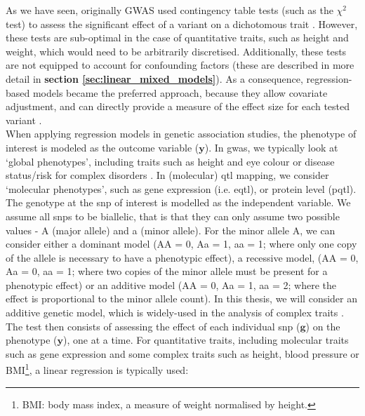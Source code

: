 As we have seen, originally GWAS used contingency table tests (such as the $\chi^2$ test) to assess the significant effect of a variant on a dichotomous trait \cite{mccarthy2008genome}.
However, these tests are sub-optimal in the case of quantitative traits, such as height and weight, which would need to be arbitrarily discretised.
Additionally, these tests are not equipped to account for confounding factors (these are described in more detail in \textbf{section \ref{sec:linear_mixed_models}}).
As a consequence, regression-based models became the preferred approach, because they allow covariate adjustment, and can directly provide a measure of the effect size for each tested variant \cite{bush2012genome}.\\

When applying regression models in genetic association studies, the phenotype of interest is modeled as the outcome variable ($\mathbf{y}$). 
In \gls{gwas}, we typically look at `global phenotypes', including traits such as height and eye colour or disease status/risk for complex disorders \cite{mccarthy2008genome}.
In (molecular) \gls{qtl} mapping, we consider `molecular phenotypes', such as gene expression (i.e. e\gls{qtl}), or protein level (p\gls{qtl}).\\

The genotype at the \gls{snp} of interest is modelled as the independent variable.
We assume all \gls{snp}s to be biallelic, that is that they can only assume two possible values - A (major allele) and a (minor allele). 
For the minor allele A, we can consider either a dominant model (AA = 0, Aa = 1, aa = 1; where only one copy of the allele is necessary to have a phenotypic effect), a recessive model, (AA = 0, Aa = 0, aa = 1; where two copies of the minor allele must be present for a phenotypic effect) or an additive model (AA = 0, Aa = 1, aa = 2; where the effect is proportional to the minor allele count). 
In this thesis, we will consider an additive genetic model, which is widely-used in the analysis of complex traits \cite{laird2010fundamentals}.\\

The test then consists of assessing the effect of each individual \gls{snp} ($\mathbf{g}$) on the phenotype ($\mathbf{y}$), one at a time.
For quantitative traits, including molecular traits such as gene expression and some complex traits such as height, blood pressure or BMI\footnote{BMI: body mass index, a measure of weight normalised by height.}, a linear regression is typically used:

